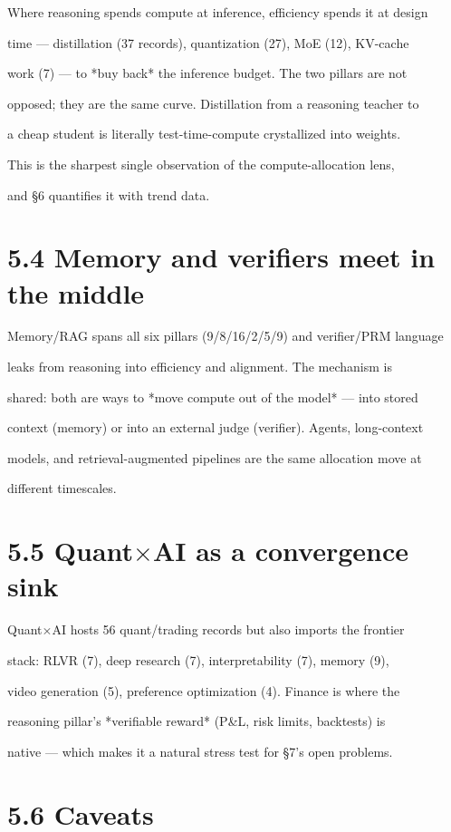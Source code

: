 \documentclass[11pt]{article}
\begin{document}
Where reasoning spends compute at inference, efficiency spends it at design

time --- distillation (37 records), quantization (27), MoE (12), KV-cache

work (7) --- to *buy back* the inference budget. The two pillars are not

opposed; they are the same curve. Distillation from a reasoning teacher to

a cheap student is literally test-time-compute crystallized into weights.

This is the sharpest single observation of the compute-allocation lens,

and \S6 quantifies it with trend data.


\section{5.4 Memory and verifiers meet in the middle}

Memory/RAG spans all six pillars (9/8/16/2/5/9) and verifier/PRM language

leaks from reasoning into efficiency and alignment. The mechanism is

shared: both are ways to *move compute out of the model* --- into stored

context (memory) or into an external judge (verifier). Agents, long-context

models, and retrieval-augmented pipelines are the same allocation move at

different timescales.


\section{5.5 Quant$\times$AI as a convergence sink}

Quant$\times$AI hosts 56 quant/trading records but also imports the frontier

stack: RLVR (7), deep research (7), interpretability (7), memory (9),

video generation (5), preference optimization (4). Finance is where the

reasoning pillar's *verifiable reward* (P\&L, risk limits, backtests) is

native --- which makes it a natural stress test for \S7's open problems.


\section{5.6 Caveats}
\end{document}
